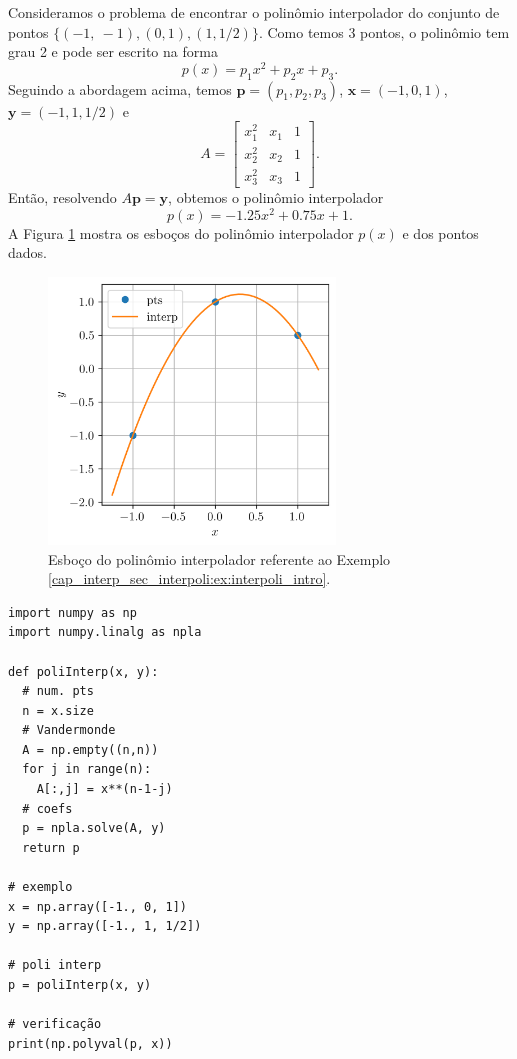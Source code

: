 \begin{ex}\label{cap_interp_sec_interpoli:ex:interpoli_intro}
  Consideramos o problema de encontrar o polinômio interpolador do conjunto de pontos $\{(-1,~-1), (0, 1), (1, 1/2)\}$. Como temos 3 pontos, o polinômio tem grau 2 e pode ser escrito na forma
  \begin{equation}
    p(x) = p_1x^2 + p_2x + p_3.
  \end{equation}
  Seguindo a abordagem acima, temos $\pmb{p}=(p_1, p_2, p_3)$, $\pmb{x} = (-1, 0, 1)$, $\pmb{y}=(-1, 1, 1/2)$ e
  \begin{equation}
    A =
    \begin{bmatrix}
      x_1^2 & x_1 & 1\\
      x_2^2 & x_2 & 1\\
      x_3^2 & x_3 & 1
    \end{bmatrix}.
  \end{equation}
  Então, resolvendo $A\pmb{p} = \pmb{y}$, obtemos o polinômio interpolador
  \begin{equation}
    p(x) = -1.25x^2 + 0.75x + 1.
  \end{equation}
A Figura \ref{cap_interp_sec_interpoli:fig:interpoli_intro} mostra os esboços do polinômio interpolador $p(x)$ e  dos pontos dados.

\begin{figure}[H]
  \centering
  \includegraphics[width=3in]{./cap_interp/dados/fig_poliInterp/fig}
  \caption{Esboço do polinômio interpolador referente ao Exemplo \ref{cap_interp_sec_interpoli:ex:interpoli_intro}.}
  \label{cap_interp_sec_interpoli:fig:interpoli_intro}
\end{figure}

\begin{lstlisting}[caption=poliInterp.py]
import numpy as np
import numpy.linalg as npla

def poliInterp(x, y):
  # num. pts
  n = x.size
  # Vandermonde
  A = np.empty((n,n))
  for j in range(n):
    A[:,j] = x**(n-1-j)
  # coefs
  p = npla.solve(A, y)
  return p

# exemplo
x = np.array([-1., 0, 1])
y = np.array([-1., 1, 1/2])

# poli interp
p = poliInterp(x, y)

# verificação
print(np.polyval(p, x))
\end{lstlisting}

\end{ex}

